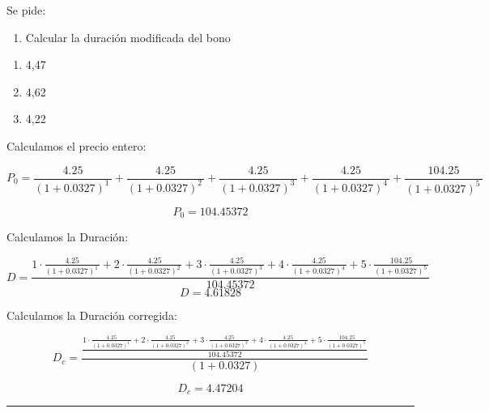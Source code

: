 \documentclass[
  letterpaper,
  DIV=11,
  numbers=noendperiod]{scrreprt}
\providecommand{\tightlist}{%
  \setlength{\itemsep}{0pt}\setlength{\parskip}{0pt}}\usepackage{longtable,booktabs,array}
\begin{document}
\begin{tcolorbox}
Se pide:

\begin{enumerate}
\def\labelenumi{\arabic{enumi}.}
\tightlist
\item
  Calcular la duración modificada del bono
\end{enumerate}

\begin{enumerate}
\def\labelenumi{\alph{enumi}.}
\item
  4,47
\item
  4,62
\item
  4,22
\end{enumerate}

\begin{tcolorbox}[enhanced jigsaw, toprule=.15mm, left=2mm, breakable, opacitybacktitle=0.6, toptitle=1mm, coltitle=black, arc=.35mm, leftrule=.75mm, bottomtitle=1mm, titlerule=0mm, title=\textcolor{quarto-callout-tip-color}{\faLightbulb}\hspace{0.5em}{Solución}, rightrule=.15mm, opacityback=0, bottomrule=.15mm, colback=white, colframe=quarto-callout-tip-color-frame, colbacktitle=quarto-callout-tip-color!10!white]

Calculamos el precio entero:

\[P_0=\frac{4.25}{\left(1+0.0327\right)^{1\:}}+\frac{4.25}{\left(1+0.0327\right)^{2\:}}+\frac{4.25}{\left(1+0.0327\right)^{3\:}}+\frac{4.25}{\left(1+0.0327\right)^{4\:}}+\frac{104.25}{\left(1+0.0327\right)^{5\:}}\]

\[P_0=104.45372\]

Calculamos la Duración:

\[D=\frac{1\cdot \frac{4.25}{\left(1+0.0327\right)^{1\:}}+2\cdot \frac{4.25}{\left(1+0.0327\right)^{2\:}}+3\cdot \frac{4.25}{\left(1+0.0327\right)^{3\:}}+4\cdot \frac{4.25}{\left(1+0.0327\right)^{4\:}}+5\cdot \frac{104.25}{\left(1+0.0327\right)^{5\:}}}{104.45372}\]
\[D=4.61828\]

Calculamos la Duración corregida:

\[D_c=\frac{\frac{1\cdot \frac{4.25}{\left(1+0.0327\right)^{1\:}}+2\cdot \frac{4.25}{\left(1+0.0327\right)^{2\:}}+3\cdot \frac{4.25}{\left(1+0.0327\right)^{3\:}}+4\cdot \frac{4.25}{\left(1+0.0327\right)^{4\:}}+5\cdot \frac{104.25}{\left(1+0.0327\right)^{5\:}}}{104.45372}}{\left(1+0.0327\right)}\]

\[D_c=4.47204\]

\end{tcolorbox}

\begin{center}\rule{0.5\linewidth}{0.5pt}\end{center}


\end{tcolorbox}
\end{document}
